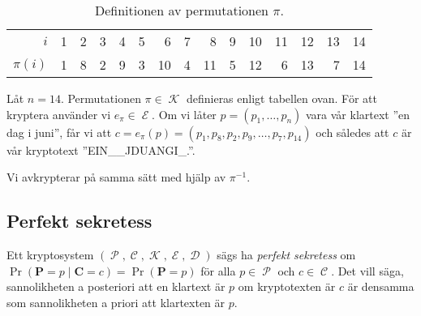 \documentclass{beamer}
\theoremstyle{definition}
\DeclareMathOperator{\p}{\mathcal{P}}
\let\P\p
\DeclareMathOperator{\C}{\mathcal{C}}
\DeclareMathOperator{\K}{\mathcal{K}}
\DeclareMathOperator{\E}{\mathcal{E}}
\DeclareMathOperator{\D}{\mathcal{D}}
\let\stoch\mathbf
\renewcommand{\p}{\stoch P}
\renewcommand{\c}{\stoch C}
\begin{document}
\begin{frame}{\insertsubsectionhead}
  \begin{table}
    \centering\small
    \begin{tabular}{r|rrrrrrrrrrrrrr}
      \toprule
      \(i\)       & 1 & 2 & 3 & 4 & 5 & 6 & 7 & 8 & 9 & 10 & 11 & 12 & 13 & 14 
      \\
      \(\pi(i)\)  & 1 & 8 & 2 & 9 & 3 & 10 & 4 & 11 & 5 & 12 & 6 & 13 & 7 & 14 
      \\
      \bottomrule
    \end{tabular}
    \caption{Definitionen av permutationen \(\pi\).}
    \label{tbl:pi}
  \end{table}
  \begin{example}\label{ex:permutationEnDagIJuni}
    Låt \(n = 14\).
    Permutationen \(\pi\in \K\) definieras enligt tabellen ovan.
    För att kryptera använder vi \(e_\pi\in \E\).
    Om vi låter \(p = (p_1, \ldots, p_n)\) vara vår klartext ''en dag i juni'', 
    får vi att \(c = e_\pi(p) = (p_1, p_8, p_2, p_9, \ldots, p_7, p_{14})\) och 
    således att \(c\) är vår kryptotext ''EIN\_\_JDUANGI\_.''.

    Vi avkrypterar på samma sätt med hjälp av \(\pi^{-1}\).
  \end{example}
\end{frame}


\subsection{Perfekt sekretess}

\begin{frame}{\insertsubsectionhead}
  \begin{definition}\label{def:perfectSecrecy}
    Ett kryptosystem \((\P, \C, \K, \E, \D)\) sägs ha \emph{perfekt sekretess} 
    om \(\Pr(\p = p\mid \c = c) = \Pr(\p = p)\) för alla \(p\in \P\) och \(c\in 
    \C\).
    Det vill säga, sannolikheten a posteriori att en klartext är \(p\) om 
    kryptotexten är \(c\) är densamma som sannolikheten a priori att klartexten 
    är \(p\).
  \end{definition}
\end{frame}
\end{document}
